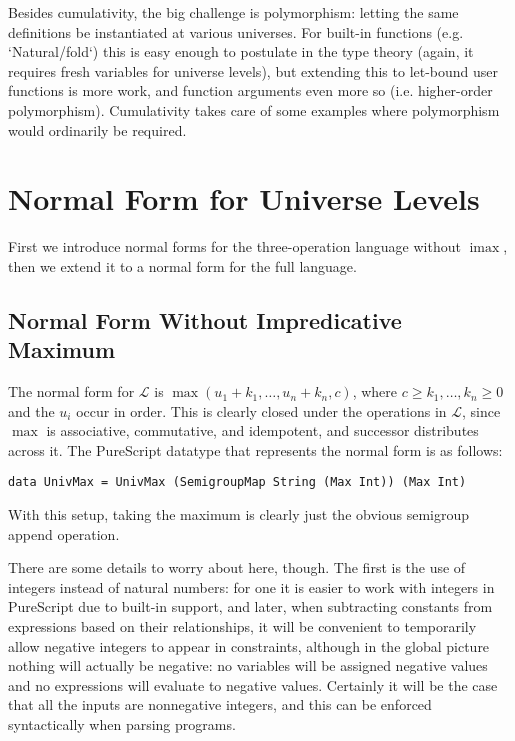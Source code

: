 \documentclass[11pt, twoside, reqno]{book}
\DeclareMathOperator{\imax}{imax}
\begin{document}
Besides cumulativity, the big challenge is polymorphism: letting the same definitions be instantiated at various universes.
For built-in functions (e.g. \inHS`Natural/fold`) this is easy enough to postulate in the type theory (again, it requires fresh variables for universe levels), but extending this to let-bound user functions is more work, and function arguments even more so (i.e. higher-order polymorphism).
Cumulativity takes care of some examples where polymorphism would ordinarily be required.

\section{Normal Form for Universe Levels}
\label{nf-uni-lvl}
First we introduce normal forms for the three-operation language without \(\imax\), then we extend it to a normal form for the full language.

\subsection{Normal Form Without Impredicative Maximum}

The normal form for \(\mathcal{L}\) is \(\max(u_1 + k_1, \dots, u_n + k_n, c)\), where \(c \ge k_1, \dots, k_n \ge 0\) and the \(u_i\) occur in order.
This is clearly closed under the operations in \(\mathcal{L}\), since \(\max\) is associative, commutative, and idempotent, and successor distributes across it.
The PureScript datatype that represents the normal form is as follows:
\begin{verbatim}
data UnivMax = UnivMax (SemigroupMap String (Max Int)) (Max Int)
\end{verbatim}
With this setup, taking the maximum is clearly just the obvious semigroup append operation.

There are some details to worry about here, though.
The first is the use of integers instead of natural numbers:
for one it is easier to work with integers in PureScript due to built-in support,
and later, when subtracting constants from expressions based on their relationships,
it will be convenient to temporarily allow negative integers to appear in constraints, although in the global picture nothing will actually be negative: no variables will be assigned negative values and no expressions will evaluate to negative values.
Certainly it will be the case that all the inputs are nonnegative integers, and this can be enforced syntactically when parsing programs.
\end{document}
